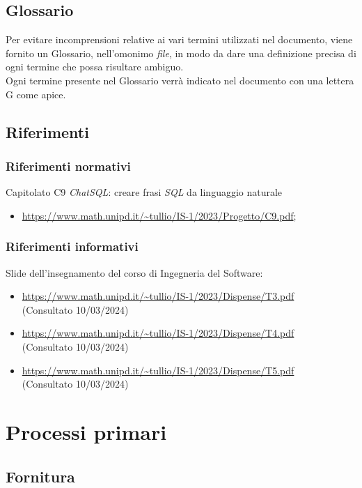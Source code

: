 \documentclass[5pt]{article}
\begin{document}
\subsection{Glossario}
Per evitare incomprensioni relative ai vari termini utilizzati nel documento, viene fornito un Glossario, nell'omonimo \textit{file}, in modo da dare una definizione precisa di ogni termine che possa risultare ambiguo.\\ Ogni termine presente nel Glossario verrà indicato nel documento con una lettera G come apice.

\subsection{Riferimenti}
\subsubsection{Riferimenti normativi}
Capitolato C9 \textit{ChatSQL}: creare frasi \textit{SQL} da linguaggio naturale
\begin{itemize}
    \item \url{https://www.math.unipd.it/~tullio/IS-1/2023/Progetto/C9.pdf};
\end{itemize}

\subsubsection{Riferimenti informativi}
Slide dell’insegnamento del corso di Ingegneria del Software:
\begin{itemize}
\item \url{https://www.math.unipd.it/~tullio/IS-1/2023/Dispense/T3.pdf} \\ (Consultato 10/03/2024)
\item \url{https://www.math.unipd.it/~tullio/IS-1/2023/Dispense/T4.pdf} \\ (Consultato 10/03/2024)
\item \url{https://www.math.unipd.it/~tullio/IS-1/2023/Dispense/T5.pdf} \\ (Consultato 10/03/2024)
\end{itemize}

\section{Processi primari}

\subsection{Fornitura}
\end{document}
